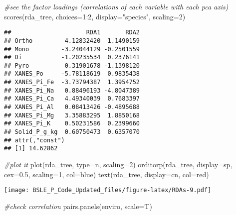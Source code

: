 \documentclass[
]{article}
\newenvironment{Shaded}{\begin{snugshade}}{\end{snugshade}}
\newcommand{\AttributeTok}[1]{\textcolor[rgb]{0.77,0.63,0.00}{#1}}
\newcommand{\CommentTok}[1]{\textcolor[rgb]{0.56,0.35,0.01}{\textit{#1}}}
\newcommand{\DecValTok}[1]{\textcolor[rgb]{0.00,0.00,0.81}{#1}}
\newcommand{\FloatTok}[1]{\textcolor[rgb]{0.00,0.00,0.81}{#1}}
\newcommand{\FunctionTok}[1]{\textcolor[rgb]{0.00,0.00,0.00}{#1}}
\newcommand{\NormalTok}[1]{#1}
\newcommand{\SpecialCharTok}[1]{\textcolor[rgb]{0.00,0.00,0.00}{#1}}
\newcommand{\StringTok}[1]{\textcolor[rgb]{0.31,0.60,0.02}{#1}}
\begin{document}
\begin{Shaded}
\begin{Highlighting}[]
\CommentTok{\#see the factor loadings (correlations of each variable with each pca axis)}
\FunctionTok{scores}\NormalTok{(rda\_tree, }\AttributeTok{choices=}\DecValTok{1}\SpecialCharTok{:}\DecValTok{2}\NormalTok{, }\AttributeTok{display=}\StringTok{"species"}\NormalTok{, }\AttributeTok{scaling=}\DecValTok{2}\NormalTok{)}
\end{Highlighting}
\end{Shaded}

\begin{verbatim}
##                     RDA1       RDA2
## Ortho         4.12832420  1.1490159
## Mono         -3.24044129 -0.2501559
## Di           -1.20235534  0.2376141
## Pyro          0.31901678 -1.1398120
## XANES_Po     -5.78118619  0.9835438
## XANES_Pi_Fe  -3.73794387  1.3954752
## XANES_Pi_Na   0.88496193 -4.8047389
## XANES_Pi_Ca   4.49340039  0.7683397
## XANES_Pi_Al   0.08413426 -0.4895688
## XANES_Pi_Mg   3.35883295  1.8850168
## XANES_Pi_K    0.50231586  0.2399660
## Solid_P_g_kg  0.60750473  0.6357070
## attr(,"const")
## [1] 14.62862
\end{verbatim}

\begin{Shaded}
\begin{Highlighting}[]
\CommentTok{\#plot it}
\FunctionTok{plot}\NormalTok{(rda\_tree, }\AttributeTok{type=}\StringTok{\textquotesingle{}n\textquotesingle{}}\NormalTok{, }\AttributeTok{scaling=}\DecValTok{2}\NormalTok{)}
\FunctionTok{orditorp}\NormalTok{(rda\_tree, }\AttributeTok{display=}\StringTok{\textquotesingle{}sp\textquotesingle{}}\NormalTok{, }\AttributeTok{cex=}\FloatTok{0.5}\NormalTok{, }\AttributeTok{scaling=}\DecValTok{1}\NormalTok{, }\AttributeTok{col=}\StringTok{\textquotesingle{}blue\textquotesingle{}}\NormalTok{)}
\FunctionTok{text}\NormalTok{(rda\_tree, }\AttributeTok{display=}\StringTok{\textquotesingle{}cn\textquotesingle{}}\NormalTok{, }\AttributeTok{col=}\StringTok{\textquotesingle{}red\textquotesingle{}}\NormalTok{)}
\end{Highlighting}
\end{Shaded}

\texttt{[image: BSLE\_P\_Code\_Updated\_files/figure-latex/RDAs-9.pdf]}

\begin{Shaded}
\begin{Highlighting}[]
\CommentTok{\#check correlation}
\FunctionTok{pairs.panels}\NormalTok{(enviro, }\AttributeTok{scale=}\NormalTok{T)}
\end{Highlighting}
\end{Shaded}
\end{document}
